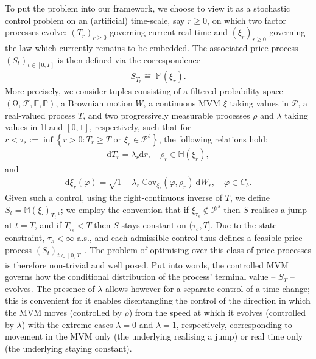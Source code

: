 \documentclass{article}
\theoremstyle{definition}
\numberwithin{equation}{section}
\numberwithin{theorem}{section}
\renewcommand{\P}{\mathbb{P}}
\newcommand{\di}{\mathrm{d}}
\newcommand{\Fb}{\mathbb{F}}
\newcommand{\Fc}{\mathcal{F}}
\newcommand{\Hb}{\mathbb{H}}
\newcommand{\Mb}{\mathbb{M}}
\newcommand{\Pc}{\mathcal{P}}
\newcommand{\Cov}{\mathbb{C}\mathrm{ov}}
\renewcommand{\P}{{\mathbb P}}
\newcommand{\Pcal}{{\mathcal P}}
\begin{document}
	To put the problem into our framework, we choose to view it as a stochastic control problem on an (artificial) time-scale, say $r\ge 0$, on which two factor processes evolve: $(T_r)_{r\ge 0}$ governing current real time and $(\xi_r)_{r\ge 0}$ governing the law which currently remains to be embedded. The associated price process $(S_t)_{t\in[0,T]}$ is then defined via the correspondence 
	\begin{align*}%
		S_{T_r}\widehat =\; \Mb(\xi_r).
	\end{align*}	
	More precisely, we consider tuples consisting of a filtered probability space $(\mathrm{\Omega},\Fc,\Fb,\P)$, a Brownian motion $W$, a continuous MVM $\xi$ taking values in $\Pcal$, a real-valued process $T$, and two progressively measurable processes $\rho$ and $\lambda$ taking values in $\Hb$ and $[0,1]$, respectively, such that for 
	$r<\tau_s:=\inf\left\{r>0:T_r\ge T\textrm{ or }\xi_r\in\Pc^s\right\}$, the following relations hold:
	 \begin{align}\label{eq:control_robust_T}
		\di T_r=\lambda_r\di r,
		\quad 
		\rho_r\in\Hb(\xi_r),
	\end{align}
	and
	\begin{align}\label{eq:control_robust_xi}
	\di\xi_r(\varphi)=\sqrt{1-\lambda_r}~
	\Cov_{\xi_r}(\varphi,\rho_r)~
	\di W_r,
	\quad\varphi\in C_b.
	\end{align}		
	Given such a control, using the right-continuous inverse of $T$, we define $S_t=\Mb(\xi_\cdot)_{T^{-1}_t}$; 
	we employ the convention that if $\xi_{\tau_s}\not\in\Pc^s$ then $S$ realises a jump at $t=T$, and if $T_{\tau_s}<T$ then $S$ stays constant on $(\tau_s,T]$.
	Due to the state-constraint, $\tau_s<\infty$ a.s., and each admissible control thus defines a feasible price process $(S_t)_{t\in[0,T]}$. The problem of optimising over this class of price processes is therefore non-trivial and well posed. 
	Put into words, the controlled MVM governs how the conditional distribution of the process' terminal value -- $S_T$ --  evolves. 
	The presence of $\lambda$ allows however for a separate control of a time-change; this is convenient for it enables disentangling the control of the direction in which the MVM moves (controlled by $\rho$) from the speed at which it evolves (controlled by $\lambda$) with the extreme cases $\lambda =0$ and $\lambda=1$, respectively, corresponding to movement in the MVM only (the underlying realising a jump) or real time only (the underlying staying constant). 
	
\end{document}
